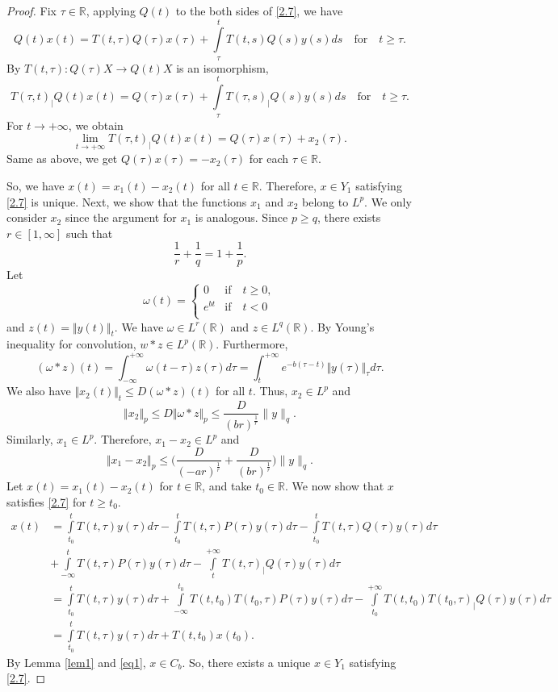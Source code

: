 \documentclass[10pt,a4paper]{amsart}
\def\r{\mathbb{R}}
\begin{document}
\begin{proof}
Fix $\tau \in \mathbb{R} $, applying $Q(t)$ to the both sides of \eqref{2.7}, we have
$$ Q(t)x(t)= T(t,\tau)Q(\tau)x(\tau)+\displaystyle\int\limits_{\tau}^{t}T(t,s)Q(s)y(s)ds  \quad  \text{for} \quad t\geq \tau.$$
By $T(t,\tau): Q(\tau)X \to Q(t)X$ is an isomorphism, 
$$ T(\tau,t)_| Q(t)x(t) = Q(\tau)x(\tau)+\displaystyle\int\limits_{\tau}^{t}T(\tau,s)_|Q(s)y(s)ds \quad  \text{for} \quad t\geq \tau.$$
For $t \to +\infty$, we obtain
$$ \lim_{t\to +\infty}T(\tau,t)_| Q(t)x(t) = Q(\tau)x(\tau)+ x_2(\tau).$$
Same as above, we get $Q(\tau)x(\tau)= -x_2(\tau)$ for each $\tau \in \mathbb{R}$.

So, we have $x(t)=x_1(t)-x_2(t)$ for all $t\in \mathbb{R}$. Therefore, $x\in Y_1$ satisfying \eqref{2.7} is unique.
Next, we show that the functions  $x_1$ and $x_2$ belong to $L^p$.
We only consider $x_2$ since the argument for $x_1$ is analogous. 
Since $p \geq q$, there exists $r \in [1,\infty]$ such that
$$\dfrac{1}{r}+\dfrac{1}{q}=1+\dfrac{1}{p}.$$ 
Let
$$
 \omega (t)=
 \begin{cases}
 0& \text{if}\quad t \geq 0,\\
e^{{b}t}& \text{if}\quad t<0\\ 
 \end{cases}
 $$
 and $z(t)=\Vert y(t)\Vert_t$. We have $\omega \in L^{r}(\r)$ and $z\in L^q(\mathbb{R})$.
By Young's inequality  for convolution,   $w*z \in L^p(\mathbb{R})$. Furthermore,
$$(\omega *z)(t)= \displaystyle \int _{-\infty}^{+\infty}\omega (t-\tau)z(\tau)d\tau=\displaystyle \int _{t}^{+\infty}e^{-{b}(\tau -t)}\Vert y(\tau) \Vert_{\tau}d\tau.$$
We also have $\Vert x_2(t)\Vert _t \le D(\omega *z)(t)$ for all $t$. Thus, $x_2 \in L^p$ and
$$\Vert x_2\Vert_p \leq D \Vert \omega *z\Vert _p \le \frac{D}{(br)^{\frac{1}{r}}} \|y\|_q.$$
Similarly, $x_1 \in L^p$. Therefore, $x_1 - x_2 \in L^p$ and
$$ \Vert x_1 -x_2 \Vert_p \le \Big(\frac{D}{(-ar)^{\frac{1}{r}}}+ \frac{D}{(br)^{\frac{1}{r}}}\Big) \|y\|_q.$$
Let $x(t)=x_1(t)-x_2(t)$ for $t \in \mathbb{R}$, and take $t_0 \in \mathbb{R}$. We now show that $x$ satisfies \eqref{2.7} for $t\ge t_0$. 
\begin{align}
x(t)&=\displaystyle\int\limits_{t_0}^{t}T(t,\tau)y(\tau)d\tau-\displaystyle\int\limits_{t_0}^{t}T(t,\tau)P(\tau)y(\tau)d\tau -\displaystyle\int\limits_{t_0}^{t}T(t,\tau)Q(\tau)y(\tau)d\tau \nonumber
\\&+\displaystyle\int\limits_{-\infty}^{t}T(t,\tau)P(\tau)y(\tau)d\tau-\displaystyle\int\limits_{t}^{+\infty}T(t,\tau)_|Q(\tau)y(\tau)d\tau \nonumber\\
&=\displaystyle\int\limits_{t_0}^{t}T(t,\tau)y(\tau)d\tau+\displaystyle\int\limits_{-\infty}^{t_0}T(t,t_0)T(t_0,\tau)P(\tau)y(\tau)d\tau-\displaystyle\int\limits_{t_0}^{+\infty}T(t,t_0)T(t_0,\tau)_|Q(\tau)y(\tau)d\tau \nonumber\\
&=\displaystyle\int\limits_{t_0}^{t}T(t,\tau)y(\tau)d\tau+T(t,t_0)x(t_0).\nonumber 
\end{align}
By Lemma \ref{lem1} and \eqref{eq1}, $x\in C_b$.
So, there exists a unique $x \in Y_1$ satisfying \eqref{2.7}.
\end{proof}
\end{document}
